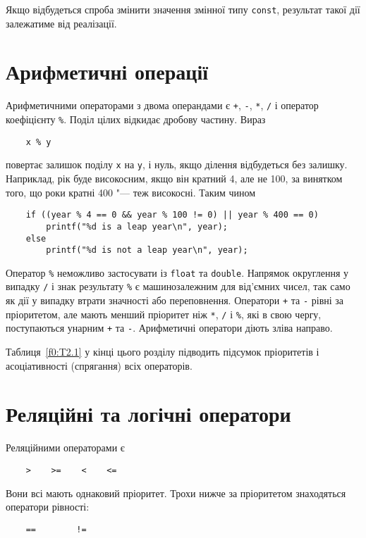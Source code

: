 \documentclass[a4paper,12pt]{book}
\begin{document}
  Якщо відбудеться спроба змінити значення змінної типу \texttt{const}, результат такої
  дії залежатиме від реалізації.

\section{Арифметичні операції}


  Арифметичними операторами з двома операндами є \texttt{+}, \texttt{-}, \texttt{*},
  \texttt{/} і оператор коефіцієнту \texttt{\%}. Поділ цілих відкидає дробову частину.
  Вираз
  \begin{verbatim}
    x % y
  \end{verbatim}
  повертає залишок поділу \texttt{x} на \texttt{y}, і нуль, якщо ділення відбудеться без
  залишку. Наприклад, рік буде високосним, якщо він кратний 4, але не 100, за винятком
  того, що роки кратні 400 "--- теж високосні. Таким чином
  \begin{verbatim}
    if ((year % 4 == 0 && year % 100 != 0) || year % 400 == 0)
        printf("%d is a leap year\n", year);
    else
        printf("%d is not a leap year\n", year);
  \end{verbatim}

  Оператор \texttt{\%} неможливо застосувати із \texttt{float} та \texttt{double}. Напрямок
  округлення у випадку \texttt{/} і знак результату \texttt{\%} є машинозалежним для
  від'ємних чисел, так само як дії у випадку втрати значності або переповнення. Оператори
  \texttt{+} та \texttt{-} рівні за пріоритетом, але мають менший пріоритет ніж
  \texttt{*}, \texttt{/} і \texttt{\%}, які в свою чергу, поступаються унарним \texttt{+}
  та \texttt{-}. Арифметичні оператори діють зліва направо.

  Таблиця~\ref{f0:T2.1} у кінці цього розділу підводить підсумок пріоритетів і
  асоціативності (спрягання) всіх операторів.

\section{Реляційні та логічні оператори}


  Реляційними операторами є
  \begin{verbatim}
    >    >=    <    <=
  \end{verbatim}

  Вони всі мають однаковий пріоритет. Трохи нижче за пріоритетом знаходяться оператори
  рівності:
  \begin{verbatim}
    ==        !=
  \end{verbatim}
\end{document}
